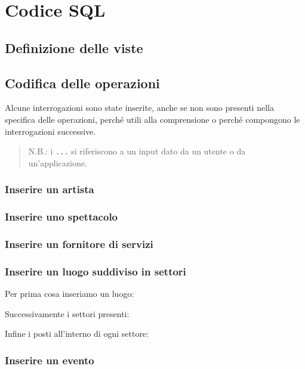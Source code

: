 \documentclass[a4paper,11pt]{article}
\begin{document}
\section{Codice SQL}

\subsection{Definizione delle viste}


\subsection{Codifica delle operazioni}
Alcune interrogazioni sono state inserite, anche se non sono presenti 
nella specifica delle operazioni, perché utili alla comprensione o perché
compongono le interrogazioni successive.

\begin{quote}
  N.B.: i \texttt{...} si riferiscono a un input dato da un utente o da un'applicazione.
\end{quote}

\subsubsection{Inserire un artista}


\subsubsection{Inserire uno spettacolo}


\subsubsection{Inserire un fornitore di servizi}


\subsubsection{Inserire un luogo suddiviso in settori}

Per prima cosa inseriamo un luogo:

Successivamente i settori presenti:

Infine i posti all'interno di ogni settore:


\subsubsection{Inserire un evento}

\end{document}
